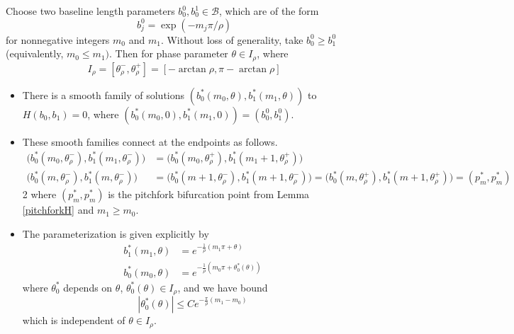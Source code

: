 \documentclass[thesis.tex]{subfiles}
\begin{document}
\begin{lemma}\label{thetaparamlemma}
Choose two baseline length parameters $b_0^0, b_0^1 \in \mathcal{B}$, which are of the form 
\begin{equation}\label{bj0form}
b_j^0 = \exp(-m_j \pi / \rho )
\end{equation}
for nonnegative integers $m_0$ and $m_1$. Without loss of generality, take $b_0^0 \geq b_1^0$ (equivalently, $m_0 \leq m_1)$. Then for phase parameter $\theta \in I_\rho$, where
\begin{equation}\label{Irho}
I_\rho = [\theta_\rho^-, \theta_\rho^+] = [-\arctan \rho,\pi - \arctan \rho] 
\end{equation}

\begin{itemize}
\item There is a smooth family of solutions $( b_0^*(m_0, \theta), b_1^*(m_1, \theta) )$ to $H(b_0, b_1) = 0$, where $(b_0^*(m_0, 0), b_1^*(m_1, 0)) = (b_0^0, b_1^0)$.

\item These smooth families connect at the endpoints as follows.
\begin{align*}
\Big( b_0^*(m_0, \theta_\rho^-), b_1^*(m_1, \theta_\rho^-) \Big) &= \Big( b_0^*(m_0, \theta_\rho^+), b_1^*(m_1+1, \theta_\rho^+) \Big) \\
\Big( b_0^*(m, \theta_\rho^-), b_1^*(m, \theta_\rho^-) \Big) &= \Big( b_0^*(m+1, \theta_\rho^-), b_1^*(m+1, \theta_\rho^-) \Big) = \Big( b_0^*(m, \theta_\rho^+), b_1^*(m+1, \theta_\rho^+) \Big) = (p^*_m, p^*_m)
\end{align*}2
where $(p^*_m, p^*_m)$ is the pitchfork bifurcation point from Lemma \ref{pitchforkH} and $m_1 \geq m_0$.

\item The parameterization is given explicitly by
\begin{equation}\label{thetaparam}
\begin{aligned}
b_1^*(m_1, \theta) &= e^{-\frac{1}{\rho}(m_1 \pi + \theta) } \\
b_0^*(m_0, \theta) &= e^{-\frac{1}{\rho}(m_0 \pi + \theta_0^*(\theta)) }
\end{aligned}
\end{equation}
where $\theta_0^*$ depends on $\theta$, $\theta_0^*(\theta) \in I_\rho$, and we have bound
\[
|\theta_0^*(\theta)| \leq C e^{ -\frac{\pi}{\rho}(m_1 - m_0)}
\]
which is independent of $\theta \in I_\rho$.
\end{itemize}


\end{lemma}
\end{document}
